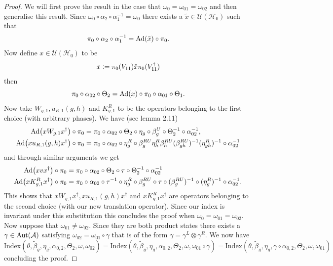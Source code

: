 \documentclass[12pt,a4paper,twoside]{article}
\newcommand{\defeq}{\vcentcolon=}
\let\originalleft\left
\let\originalright\right
\renewcommand{\left}{\mathopen{}\mathclose\bgroup\originalleft}
\renewcommand{\right}{\aftergroup\egroup\originalright}
\newcommand{\UU}{\mathcal U}
\newcommand{\HH}{\mathcal H}
\renewcommand{\AA}{\mathcal A}
\newcommand{\Ad}[1]{\textrm{Ad}\left(#1\right)}
\newcommand{\Aut}[1]{\textrm{Aut}\left(#1\right)}
\theoremstyle{definition}
\numberwithin{equation}{section}
\begin{document}
\begin{proof}
	We will first prove the result in the case that $\omega_0=\omega_{01}=\omega_{02}$ and then generalise this result. Since $\omega_0\circ\alpha_2\circ\alpha_1^{-1}=\omega_0$ there exists a $\tilde{x}\in\UU(\HH_0)$ such that
	\begin{equation}
		\pi_0\circ\alpha_2\circ\alpha_1^{-1}=\Ad{\tilde{x}}\circ\pi_0.
	\end{equation}
	Now define $x\in\UU(\HH_0)$ to be
	\begin{equation}
		x\defeq \pi_0(V_{11})\tilde{x} \pi_0(V_{11}^\dagger)
	\end{equation}
	then
	\begin{equation}
		\pi_0\circ\alpha_{02}\circ\Theta_2=\Ad{x}\circ\pi_0\circ\alpha_{01}\circ\Theta_1.
	\end{equation}
	Now take $W_{g,1},u_{R,1}(g,h)$ and $K^R_{g,1}$ to be the operators belonging to the first choice (with arbitrary phases). 
	We have (see \cite{ogata2021h3gmathbb} lemma 2.11)
	\begin{align}
		\Ad{xW_{g,1}x^\dagger}\circ\pi_0&=\pi_0\circ \alpha_{02}\circ\Theta_2\circ\eta_g\circ\beta_g^U\circ\Theta_2^{-1}\circ\alpha_{02}^{-1},\\
		\Ad{xu_{R,1}(g,h)x^\dagger}\circ\pi_0&=\pi_0\circ \alpha_{02}\circ\eta_g^R\circ\beta_g^{RU}\eta_h^R\beta_{h}^{RU}(\beta_{gh}^{RU})^{-1}(\eta_{gh}^R)^{-1}\circ\alpha_{02}^{-1}
	\end{align}
	and through similar arguments we get
	\begin{align}
		\Ad{xvx^\dagger}\circ\pi_0&=\pi_0\circ\alpha_{02}\circ\Theta_2\circ\tau\circ\Theta_2^{-1}\circ\alpha_{02}^{-1}\\
		\Ad{xK^R_{g,1}x^\dagger}\circ\pi_0&=\pi_0\circ \alpha_{02}\circ\tau^{-1}\circ\eta_g^R\circ\beta_g^{RU}\circ\tau\circ(\beta_g^{RU})^{-1}\circ(\eta^R_g)^{-1}\circ\alpha_{02}^{-1}.
	\end{align}
	This shows that $xW_{g,1}x^\dagger,xu_{R,1}(g,h)x^\dagger$ and $xK^R_{g,1}x^\dagger$ are operators belonging to the second choice (with our new translation operator). Since our index is invariant under this substitution this concludes the proof when $\omega_0=\omega_{01}=\omega_{02}$. Now suppose that $\omega_{01}\neq\omega_{02}$. Since they are both product states there exists a $\gamma\in\Aut{\AA}$ satisfying $\omega_{02}=\omega_{01}\circ\gamma$ that is of the form $\gamma=\gamma^L\otimes\gamma^R$. We now have
	\begin{equation}
		\textrm{Index}(\theta,\tilde{\beta}_g,\eta_g,\alpha_{0,2},\Theta_2,\omega,\omega_{02})=\textrm{Index}(\theta,\tilde{\beta}_g,\eta_g,\alpha_{0,2},\Theta_2,\omega,\omega_{01}\circ\gamma)=\textrm{Index}(\theta,\tilde{\beta}_g,\eta_g,\gamma\circ\alpha_{0,2},\Theta_2,\omega,\omega_{01})
	\end{equation}
	concluding the proof.
\end{proof}
\end{document}
